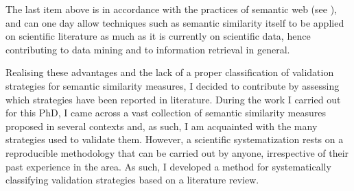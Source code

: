 The last item above is in accordance with the practices of semantic web (see ), and can one day allow techniques such as semantic similarity itself to be applied on scientific literature as much as it is currently on scientific data, hence contributing to data mining and to information retrieval in general.

Realising these advantages and the lack of a proper classification of validation strategies for semantic similarity measures, I decided to contribute by assessing which strategies have been reported in literature. During the work I carried out for this PhD, I came across a vast collection of semantic similarity measures proposed in several contexts and, as such, I am acquainted with the many strategies used to validate them. However, a scientific systematization rests on a reproducible methodology that can be carried out by anyone, irrespective of their past experience in the area. As such, I developed a method for systematically classifying validation strategies based on a literature review.

